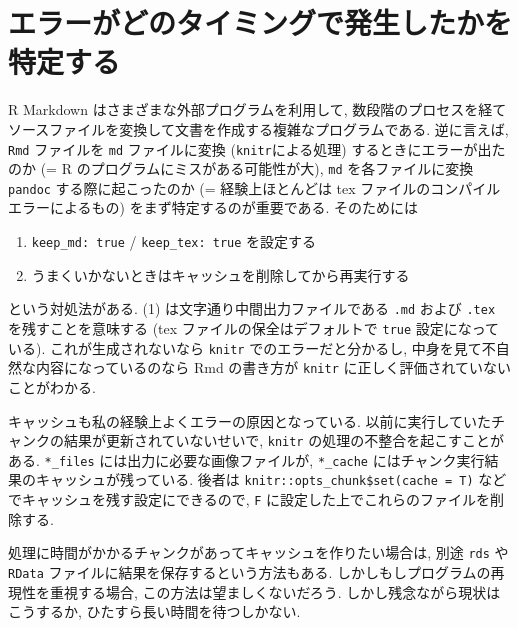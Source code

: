 \documentclass[
]{bxjsbook}
\providecommand{\tightlist}{%
  \setlength{\itemsep}{0pt}\setlength{\parskip}{0pt}}
\theoremstyle{definition}
\theoremstyle{definition}
\theoremstyle{definition}
\theoremstyle{remark}
\begin{document}
\hypertarget{ux30a8ux30e9ux30fcux304cux3069ux306eux30bfux30a4ux30dfux30f3ux30b0ux3067ux767aux751fux3057ux305fux304bux3092ux7279ux5b9aux3059ux308b}{%
\section{エラーがどのタイミングで発生したかを特定する}\label{ux30a8ux30e9ux30fcux304cux3069ux306eux30bfux30a4ux30dfux30f3ux30b0ux3067ux767aux751fux3057ux305fux304bux3092ux7279ux5b9aux3059ux308b}}

R Markdown はさまざまな外部プログラムを利用して,
数段階のプロセスを経てソースファイルを変換して文書を作成する複雑なプログラムである.
逆に言えば, \texttt{Rmd} ファイルを \texttt{md} ファイルに変換
(\texttt{knitr}による処理) するときにエラーが出たのか (= R
のプログラムにミスがある可能性が大), \texttt{md} を各ファイルに変換
\texttt{pandoc} する際に起こったのか (= 経験上ほとんどは tex
ファイルのコンパイルエラーによるもの) をまず特定するのが重要である.
そのためには

\begin{enumerate}
\def\labelenumi{\arabic{enumi}.}
\tightlist
\item
  \texttt{keep\_md:\ true} / \texttt{keep\_tex:\ true} を設定する
\item
  うまくいかないときはキャッシュを削除してから再実行する
\end{enumerate}

という対処法がある. (1) は文字通り中間出力ファイルである \texttt{.md}
および \texttt{.tex} を残すことを意味する (tex
ファイルの保全はデフォルトで \texttt{true} 設定になっている).
これが生成されないなら \texttt{knitr} でのエラーだと分かるし,
中身を見て不自然な内容になっているのなら Rmd の書き方が \texttt{knitr}
に正しく評価されていないことがわかる.

キャッシュも私の経験上よくエラーの原因となっている.
以前に実行していたチャンクの結果が更新されていないせいで, \texttt{knitr}
の処理の不整合を起こすことがある. \texttt{*\_files}
には出力に必要な画像ファイルが, \texttt{*\_cache}
にはチャンク実行結果のキャッシュが残っている. 後者は
\texttt{knitr::opts\_chunk\$set(cache\ =\ T)}
などでキャッシュを残す設定にできるので, \texttt{F}
に設定した上でこれらのファイルを削除する.

処理に時間がかかるチャンクがあってキャッシュを作りたい場合は, 別途
\texttt{rds} や \texttt{RData} ファイルに結果を保存するという方法もある.
しかしもしプログラムの再現性を重視する場合,
この方法は望ましくないだろう. しかし残念ながら現状はこうするか,
ひたすら長い時間を待つしかない.
\end{document}
